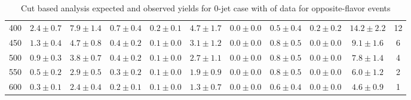 \begin{table}
{\begin{center}
\begin{tabular}{l c c c c c c c c c c }
400 & $2.4\pm0.7$ & $7.9\pm1.4$ & $0.7\pm0.4$ & $0.2\pm0.1$ & $4.7\pm1.7$ & $0.0\pm0.0$ & $0.5\pm0.4$ & $0.2\pm0.2$ & $14.2\pm2.2$ & 12 \\
450 & $1.3\pm0.4$ & $4.7\pm0.8$ & $0.4\pm0.2$ & $0.1\pm0.0$ & $3.1\pm1.2$ & $0.0\pm0.0$ & $0.8\pm0.5$ & $0.0\pm0.0$ & $9.1\pm1.6$ & 6 \\
500 & $0.9\pm0.3$ & $3.8\pm0.7$ & $0.4\pm0.2$ & $0.1\pm0.0$ & $2.7\pm1.1$ & $0.0\pm0.0$ & $0.8\pm0.5$ & $0.0\pm0.0$ & $7.8\pm1.4$ & 4 \\
550 & $0.5\pm0.2$ & $2.9\pm0.5$ & $0.3\pm0.2$ & $0.1\pm0.0$ & $1.9\pm0.9$ & $0.0\pm0.0$ & $0.8\pm0.5$ & $0.0\pm0.0$ & $6.0\pm1.2$ & 2 \\
600 & $0.3\pm0.1$ & $2.4\pm0.4$ & $0.2\pm0.1$ & $0.1\pm0.0$ & $1.3\pm0.7$ & $0.0\pm0.0$ & $0.6\pm0.4$ & $0.0\pm0.0$ & $4.6\pm0.9$ & 1 \\
\hline
\end{tabular}
\end{center}
}
\caption{Cut based analysis expected and observed yields for 0-jet case with \intlumi of data for opposite-flavor events}
\label{tab:cutbase_inputs_of_0j_data}
\end{table}

